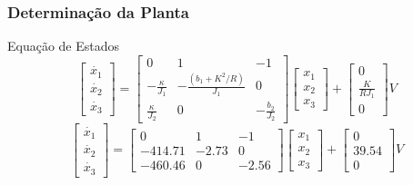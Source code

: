 \documentclass{beamer}
\begin{document}
\begin{frame}
\frametitle{Determinação da Planta}
\begin{block}{Equação de Estados}
	\begin{equation*}
	\label{eq:ss}
	\left[ \begin{array}{c}
	\dot{x_1} \\
	\dot{x_2} \\
	\dot{x_3} \end{array} \right]
	=
	\left[ \begin{array}{ccc}
	0 & 1 & -1 \\
	-\frac{\kappa}{J_1} & -\frac{(b_1+K^2/R)}{J_1} & 0 \\
	\frac{\kappa}{J_2} & 0 & -\frac{b_2}{J_2} \end{array} \right]
	\left[ \begin{array}{c}
	x_1 \\
	x_2 \\
	x_3  \end{array} \right]
	+
	\left[ \begin{array}{c}
	0 				\\
	\frac{K}{RJ_1} 	\\
	0				\end{array} \right]
	V
	\end{equation*}
	\begin{equation*}
	\label{eq:ssval}
	\left[ \begin{array}{c}
	\dot{x_1} \\
	\dot{x_2} \\
	\dot{x_3} \end{array} \right]
	=
	\left[ \begin{array}{ccc}
	0 & 1 & -1 \\
	-414.71 & -2.73 & 0 \\
	-460.46 & 0 & -2.56 \end{array} \right]
	\left[ \begin{array}{c}
	x_1 \\
	x_2 \\
	x_3  \end{array} \right]
	+
	\left[ \begin{array}{c}
	0 				\\
	39.54 	\\
	0				\end{array} \right]
	V
	\end{equation*}
\end{block}
\end{frame}
\end{document}
